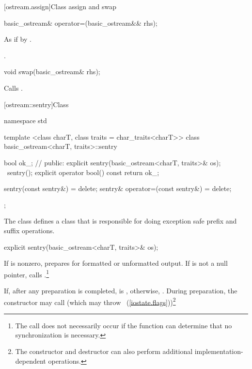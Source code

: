 [ostream.assign]{Class  assign and swap}

%
\begin{itemdecl}
basic_ostream& operator=(basic_ostream&& rhs);
\end{itemdecl}

\begin{itemdescr}
\pnum
\effects As if by .

\pnum
\returns {}.
\end{itemdescr}

%
\begin{itemdecl}
void swap(basic_ostream& rhs);
\end{itemdecl}

\begin{itemdescr}
\pnum
\effects Calls .
\end{itemdescr}

[ostream::sentry]{Class }

%
%
\begin{codeblock}
namespace std {
  template <class charT, class traits = char_traits<charT>>
  class basic_ostream<charT, traits>::sentry {
    bool ok_; // \expos
  public:
    explicit sentry(basic_ostream<charT, traits>& os);
    ~sentry();
    explicit operator bool() const { return ok_; }

    sentry(const sentry&) = delete;
    sentry& operator=(const sentry&) = delete;
  };
}
\end{codeblock}

\pnum
The class
defines a class that is responsible for doing exception safe prefix and suffix
operations.

%
\begin{itemdecl}
explicit sentry(basic_ostream<charT, traits>& os);
\end{itemdecl}

\begin{itemdescr}
\pnum
If
is nonzero, prepares for formatted or unformatted output.
If
is not a null pointer, calls
%
.\footnote{The call
does not necessarily occur if the function can determine that no
synchronization is necessary.}

\pnum
If, after any preparation is completed,
is
,
otherwise,
.
During preparation, the constructor may call
(which may throw
~(\ref{iostate.flags}))\footnote{The
constructor and destructor
can also perform additional
implementation-dependent operations.}
\end{itemdescr}

